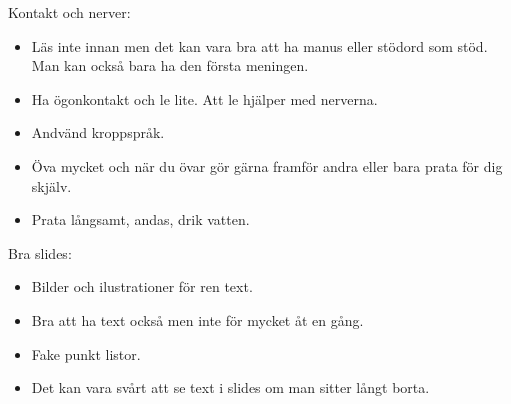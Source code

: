 Kontakt och nerver:
\begin{itemize}
\item Läs inte innan men det kan vara bra att ha manus eller stödord som stöd. Man kan också bara ha den första meningen.
\item Ha ögonkontakt och le lite. Att le hjälper med nerverna.
\item Andvänd kroppspråk. 
\item Öva mycket och när du övar gör gärna framför andra eller bara prata för dig skjälv.
\item Prata långsamt, andas, drik vatten.
\end{itemize}

Bra slides:
\begin{itemize}
\item Bilder och ilustrationer för ren text.
\item Bra att ha text också men inte för mycket åt en gång.
\item Fake punkt listor.
  \item Det kan vara svårt att se text i slides om man sitter långt borta.
\end{itemize}



%
%
%
%
%
%
%
%
%
%
%
%
%
%
%
%
%

